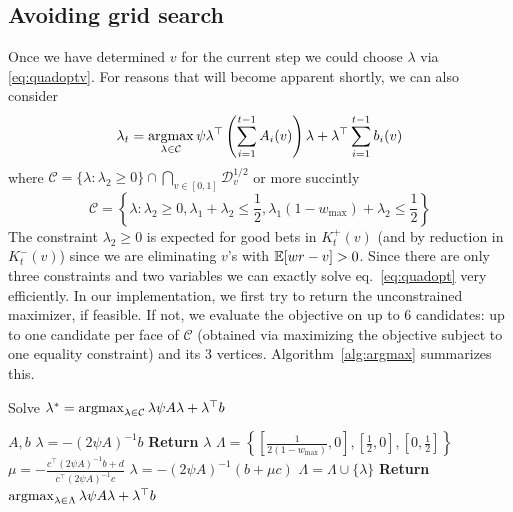 \subsection{Avoiding grid search}
\label{sec:avoid-grid}
Once we have determined $v$ for the current step we could choose $\lambda$ via
\eqref{eq:quadoptv}. For reasons that will become apparent shortly, we can also
consider
\begin{equation}
\lambda_t = \operatorname*{argmax}_{\lambda \in \mathcal{C}}
\psi  \lambda^\top \left(\sum_{i=1}^{t-1} A_i(v)\right) \lambda 
+ \lambda^\top \sum_{i=1}^{t-1} b_i(v)
\label{eq:quadopt}
\end{equation}
where $\mathcal{C}=\{\lambda: \lambda_2 \geq 0\}\cap \bigcap_{v\in [0,1]} \mathcal{D}_v^{1/2}$
or more succintly
$$
\mathcal{C} = \left\{\lambda: \lambda_2\geq 0, 
\lambda_1 + \lambda_2 \leq \frac{1}{2},
\lambda_1 \left(1-w_{\max}\right) + \lambda_2 \leq  \frac{1}{2}
\right\}
$$
The constraint $\lambda_2\geq 0$ is expected for good bets in $K_t^+(v)$ (and
by reduction in $K_t^-(v)$) since we are eliminating $v$'s with $\mathbb{E}[wr-v]>0$.
Since there are only three constraints and two variables we can exactly solve
eq.~\eqref{eq:quadopt} very efficiently. In our implementation, we first try to
return the unconstrained maximizer, if feasible.  If not, we evaluate the
objective on up to 6 candidates: up to one candidate per face of $\mathcal{C}$
(obtained via maximizing the objective subject to one equality constraint) and
its 3 vertices. Algorithm~\ref{alg:argmax} summarizes this.

\begin{algorithm}[tb]
   \caption{Solve $\lambda^* = \operatorname*{argmax}_{\lambda \in \mathcal{C}} \lambda \psi A \lambda + \lambda^\top b$}
   \label{alg:argmax}
\begin{algorithmic}
     $A, b$
    \STATE $\lambda = -(2\psi A)^{-1} b$
        \STATE \textbf{Return} $\lambda$
    \ENDIF
    \STATE $\Lambda = \left\{\left[\frac{1}{2(1-w_{\max})},0\right],\left[\frac12,0\right],\left[0,\frac12\right]\right\}$     
    \STATE $\mu = -\frac{c^\top (2\psi A)^{-1}b+d}{c^\top (2\psi A)^{-1}c}$
    \STATE $\lambda = -(2\psi A)^{-1} (b + \mu c)$ 
    \STATE $\Lambda = \Lambda \cup \{\lambda\}$ 
    \ENDIF 
    \ENDFOR
    \STATE \textbf{Return}  $\operatorname*{argmax}_{\lambda \in \Lambda} \lambda \psi A \lambda + \lambda^\top b$
\end{algorithmic}
\end{algorithm}

